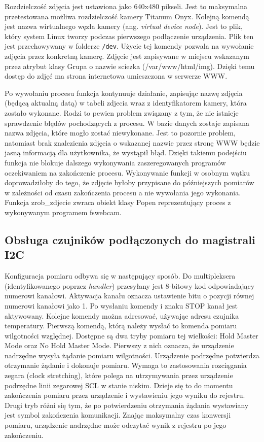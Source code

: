 \documentclass[a4paper,12pt,twoside]{article}
\begin{document}
Rozdzielczość zdjęcia jest ustawiona jako 640x480 pikseli. Jest to maksymalna przetestowana możliwa rozdzielczość kamery Titanum Onyx. Kolejną komendą jest nazwa wirtualnego węzła kamery (ang. \textit{virtual device node}). Jest to plik, który system Linux tworzy podczas pierwszego podłączenie urządzenia. Plik ten jest przechowywany w folderze \texttt{/dev}. Użycie tej komendy pozwala na wywołanie zdjęcia przez konkretną kamerę. Zdjęcie jest zapisywane w miejscu wskazanym przez atrybut klasy Grupa o nazwie sciezka (/var/www/html/img). Dzięki temu dostęp do zdjęć ma strona internetowa umieszczona w serwerze WWW.

Po wywołaniu procesu funkcja kontynuuje działanie, zapisując nazwę zdjęcia (będącą aktualną datą) w tabeli zdjecia wraz z identyfikatorem kamery, która zostało wykonane. Rodzi to pewien problem związany z tym, że nie istnieje sprawdzenie błędów pochodzących z procesu. W bazie danych zostaje zapisana nazwa zdjęcia, które mogło zostać niewykonane. Jest to pozornie problem, natomiast brak znalezienia zdjęcia o wskazanej nazwie przez stronę WWW będzie jasną informacją dla użytkownika, że wystąpił błąd. Dzięki takiemu podejściu funkcja nie blokuje dalszego wykonywania zaszeregowanych programów oczekiwaniem na zakończenie procesu. Wykonywanie funkcji w osobnym wątku doprowadziłoby do tego, że zdjęcie byłoby przypisane do późniejszych pomiarów w zależności od czasu zakończenia procesu a nie wywołania jego wykonania. Funkcja zrob{\_}zdjecie zwraca obiekt klasy Popen reprezentujący proces z wykonywanym programem fswebcam. 
\subsection{Obsługa czujników podłączonych do magistrali I2C}
Konfiguracja pomiaru odbywa się w następujący sposób. Do multipleksera (identyfikowanego poprzez \textit{handler}) przesyłany jest 8-bitowy kod odpowiadający numerowi kanałowi. Aktywacja kanału oznacza ustawienie bitu o pozycji równej numerowi kanałowi jako 1. Po wysłaniu komendy i znaku STOP kanał jest aktywowany. Kolejne komendy można adresować, używając adresu czujnika temperatury. Pierwszą komendą, którą należy wysłać to komenda pomiaru wilgotności względnej. Dostępne są dwa tryby pomiaru tej wielkości: Hold Master Mode oraz No Hold Master Mode. Pierwszy z nich oznacza, że urządzenie nadrzędne wysyła żądanie pomiaru wilgotności. Urządzenie podrzędne potwierdza otrzymanie żądanie i dokonuje pomiaru. Wymaga to zastosowania rozciągania zegara (clock stretching), które polega na utrzymywania przez urządzenie podrzędne linii zegarowej SCL w stanie niskim. Dzieje się to do momentu zakończenia pomiaru przez urządzenie i wystawieniu jego wyniku do rejestru. Drugi tryb różni się tym, że po potwierdzeniu otrzymania żądania wystawiany jest symbol zakończenia komunikacji. Znając maksymalny czas konwersji pomiaru, urządzenie nadrzędne może odczytać wynik z rejestru po jego zakończeniu. 
\end{document}
